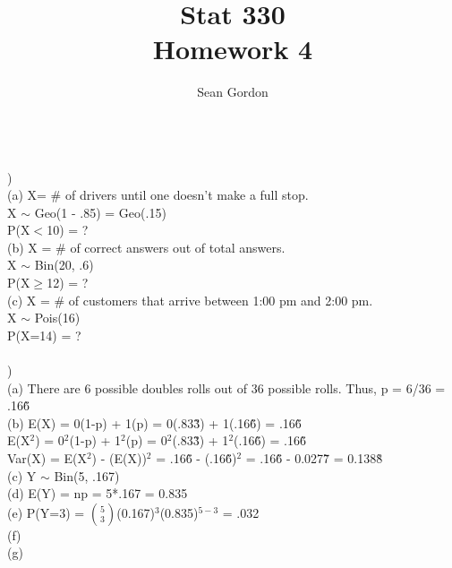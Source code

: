 \documentclass[12pt]{article}
\title{Stat 330\\Homework 4}
\author{Sean Gordon}
\begin{document}
\maketitle


\noindent\hrulefill \\


)\\
\indent (a) X= \# of drivers until one doesn't make a full stop.\\
\indent \indent X $\sim$ Geo(1 - .85) = Geo(.15)\\
\indent \indent P(X$<$10) = ?\\

\indent (b) X = \# of correct answers out of total answers.\\
\indent \indent X $\sim$ Bin(20, .6)\\
\indent \indent P(X$\ge$12) = ?\\

\indent (c) X = \# of customers that arrive between 1:00 pm and 2:00 pm.\\
\indent \indent X $\sim$ Pois(16)\\
\indent \indent P(X=14) = ?\\


\noindent \hrulefill \\

)\\
\indent (a) There are 6 possible doubles rolls out of 36 possible rolls. Thus, p = 6/36 = .16\~6\\

\indent (b) E(X) = 0(1-p) + 1(p) = 0(.83\~3) + 1(.16\~6) = .16\~6\\
\indent \indent E(X$^2$) = 0$^2$(1-p) + 1$^2$(p) = 0$^2$(.83\~3) + 1$^2$(.16\~6) = .16\~6\\
\indent \indent Var(X) = E(X$^2$) - (E(X))$^2$ = .16\~6 - (.16\~6)$^2$ = .16\~6 - 0.027\~7 = 0.138\~8\\

\indent (c) Y $\sim$ Bin(5, .167)\\

\indent (d) E(Y) = np = 5*.167 = 0.835\\

\indent (e) P(Y=3) = {\Large$\binom{5}{3}$}(0.167)$^{3}$(0.835)$^{5-3}$ = .032\\

\indent (f)\\

\indent (g)\\
\end{document}
